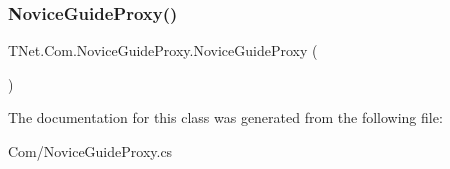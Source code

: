 \subsubsection{\texorpdfstring{Novice\+Guide\+Proxy()}{NoviceGuideProxy()}}
{\footnotesize\ttfamily T\+Net.\+Com.\+Novice\+Guide\+Proxy.\+Novice\+Guide\+Proxy (\begin{DoxyParamCaption}{ }\end{DoxyParamCaption})}







The documentation for this class was generated from the following file\+:\begin{DoxyCompactItemize}
\item 
Com/Novice\+Guide\+Proxy.\+cs\end{DoxyCompactItemize}
